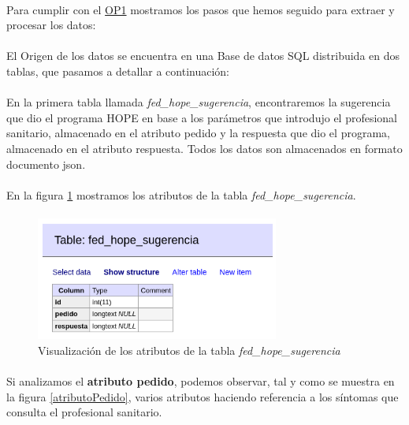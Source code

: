 \documentclass[10pt,a4paper,oneside]{book}
\begin{document}
\paragraph{}
Para cumplir con el \hyperref[op:OP1]{OP1} mostramos los pasos que hemos seguido para extraer y procesar los datos:

\paragraph{}
El Origen de los datos se encuentra en una Base de datos SQL distribuida en dos tablas, que pasamos a detallar a continuación:

\paragraph{}
En la primera tabla llamada \textit{fed\_hope\_sugerencia}, encontraremos la sugerencia que dio el programa HOPE en base a los parámetros que introdujo el profesional sanitario, almacenado en el atributo pedido y la respuesta que dio el programa, almacenado en el atributo respuesta. Todos los datos son almacenados en formato documento json.

\paragraph{}
En la figura \ref{tablaFedHopeSugerencia} mostramos los atributos de la tabla \textit{fed\_hope\_sugerencia}.

\paragraph{}
\begin{figure}[!htb]
  \centering
    \includegraphics[width=8cm]{images/metodologia_tabla_fed_hope_sugerencia.png}
    \caption{Visualización de los atributos de la tabla \textit{fed\_hope\_sugerencia}}
  \label{tablaFedHopeSugerencia}
\end{figure}

\paragraph{}
Si analizamos el \textbf{atributo pedido}, podemos observar, tal y como se muestra en la figura \ref{atributoPedido}, varios atributos haciendo referencia a los síntomas que consulta el profesional sanitario.
\end{document}
